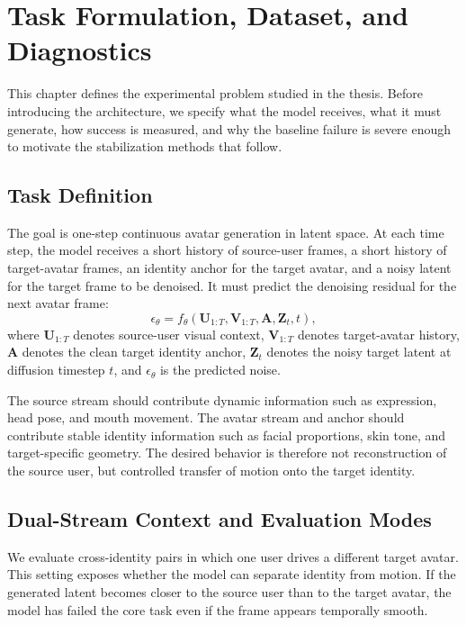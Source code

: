 \documentclass[12pt,letterpaper]{report}
\begin{document}
\chapter{Task Formulation, Dataset, and Diagnostics}\label{ch:task}

This chapter defines the experimental problem studied in the thesis. Before introducing the architecture, we specify what the model receives, what it must generate, how success is measured, and why the baseline failure is severe enough to motivate the stabilization methods that follow.

\section{Task Definition}

The goal is one-step continuous avatar generation in latent space. At each time step, the model receives a short history of source-user frames, a short history of target-avatar frames, an identity anchor for the target avatar, and a noisy latent for the target frame to be denoised. It must predict the denoising residual for the next avatar frame:
\[
    \epsilon_\theta =
    f_\theta(\mathbf{U}_{1:T}, \mathbf{V}_{1:T}, \mathbf{A}, \mathbf{Z}_t, t),
\]
where $\mathbf{U}_{1:T}$ denotes source-user visual context, $\mathbf{V}_{1:T}$ denotes target-avatar history, $\mathbf{A}$ denotes the clean target identity anchor, $\mathbf{Z}_t$ denotes the noisy target latent at diffusion timestep $t$, and $\epsilon_\theta$ is the predicted noise.

The source stream should contribute dynamic information such as expression, head pose, and mouth movement. The avatar stream and anchor should contribute stable identity information such as facial proportions, skin tone, and target-specific geometry. The desired behavior is therefore not reconstruction of the source user, but controlled transfer of motion onto the target identity.

\section{Dual-Stream Context and Evaluation Modes}

We evaluate cross-identity pairs in which one user drives a different target avatar. This setting exposes whether the model can separate identity from motion. If the generated latent becomes closer to the source user than to the target avatar, the model has failed the core task even if the frame appears temporally smooth.
\end{document}
